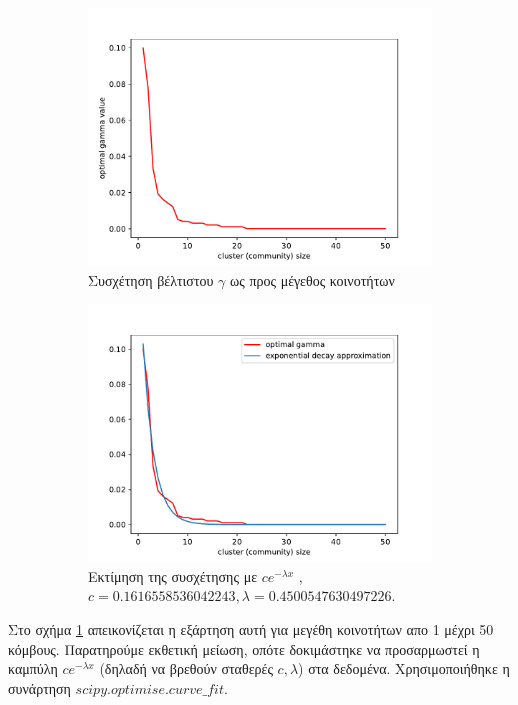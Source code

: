 \documentclass[12pt, letterpaper]{article}
\begin{document}
\begin{figure}
  \begin{subfigure}{0.5\textwidth}
    \centering
    \includegraphics[width=0.9\linewidth]{gamma_wrt_cluster_nodes.pdf}
    \caption{Συσχέτηση βέλτιστου $\gamma$ ως προς μέγεθος κοινοτήτων}
    \label{optimal_gamma}
  \end{subfigure}
  \begin{subfigure}{0.5\textwidth}
    \centering
    \includegraphics[width=0.9\linewidth]{gammas_approximation.pdf}
    \caption{Εκτίμηση της συσχέτησης με $ce^{-\lambda x}$ , $c = 0.1616558536042243, \lambda = 0.4500547630497226$.}
    \label{optimal_gamma_approx}
  \end{subfigure}

  \caption{}
  \label{}
\end{figure}

Στο σχήμα \ref{optimal_gamma} απεικονίζεται η εξάρτηση αυτή για μεγέθη κοινοτήτων 
απο 1 μέχρι 50 κόμβους. Παρατηρούμε εκθετική μείωση, οπότε δοκιμάστηκε να προσαρμωστεί 
η καμπύλη $c e^{- \lambda x}$ (δηλαδή να βρεθούν σταθερές $c, \lambda$) στα δεδομένα.
Χρησιμοποιήθηκε η συνάρτηση $scipy.optimise.curve\_fit$.
\end{document}
